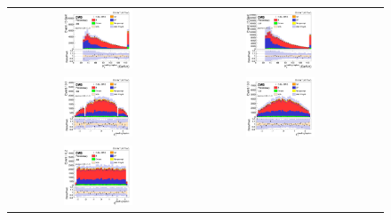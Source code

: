 \begin{figure}[ht]
  \begin{center}
    \begin{tabular}{ccc}
      \includegraphics[width=0.4\textwidth]{figures/tW/fig/Step2/ee/H_lepton_led_pt.png}&
      \includegraphics[width=0.4\textwidth]{figures/tW/fig/Step2/mumu/H_lepton_led_pt.png}\\
      \includegraphics[width=0.4\textwidth]{figures/tW/fig/Step2/ee/H_lepton_led_eta.png}&
      \includegraphics[width=0.4\textwidth]{figures/tW/fig/Step2/mumu/H_lepton_led_eta.png}\\
      \includegraphics[width=0.4\textwidth]{figures/tW/fig/Step2/ee/H_lepton_led_phi.png}&

\end{tabular}
\end{center}
\end{figure}
